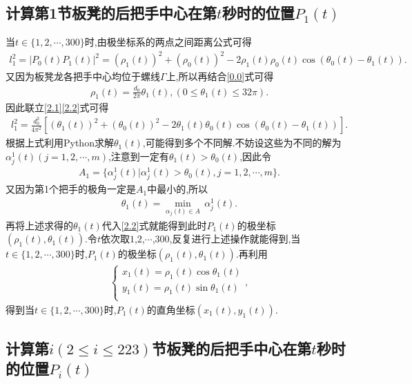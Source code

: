 \documentclass[lang=cn,newtx,10pt,scheme=chinese]{../Template/elegantbook}
\begin{document}
\subsection{计算第1节板凳的后把手中心在第\(t\)秒时的位置\(P_1(t)\)}\label{2.(1)}

当\(t\in \{ 1,2,\cdots ,300 \}\)时,由极坐标系的两点之间距离公式可得
\begin{align}
l_{1}^{2}=| P_0(t)P_1(t)|^2=(\rho _1(t))^2+(\rho _0(t))^2 - 2\rho _1(t)\rho _0(t)\cos (\theta _0(t)-\theta _1(t)) .\label{2.1} 
\end{align}
又因为板凳龙各把手中心均位于螺线\(\varGamma\)上,所以再结合\eqref{0.0}式可得
\begin{align}
\rho _1(t)=\frac{d_0}{2\pi}\theta _1(t),(0\leqslant \theta _1(t)\leqslant 32\pi) .\label{2.2}
\end{align}
因此联立\eqref{2.1}\eqref{2.2}式可得
\begin{align}
l_{1}^{2}=\frac{d_{0}^{2}}{4\pi ^2}[(\theta _1(t))^2+(\theta _0(t))^2 - 2\theta _1(t)\theta _0(t)\cos (\theta _0(t)-\theta _1(t))] .\label{2.0}
\end{align}
根据上式利用Python求解\(\theta _1(t)\),可能得到多个不同解.不妨设这些为不同的解为\(\alpha _{j}^{1}(t) (j = 1,2,\cdots ,m)\),注意到一定有\(\theta _1(t)>\theta _0(t)\),因此令
\begin{align}
A_1 = \{ \alpha _{j}^{1}(t) |\alpha _{j}^{1}(t) >\theta _0(t),j = 1,2,\cdots ,m \} .
\end{align}
又因为第1个把手的极角一定是$A_1$中最小的,所以
\begin{align}
\theta _1(t)=\underset{\alpha _j(t)\in A}{\min}\,\alpha _{j}^{1}(t).
\end{align}
再将上述求得的\(\theta _1(t)\)代入\eqref{2.2}式就能得到此时\(P_1(t)\)的极坐标\((\rho _1(t),\theta _1(t))\).令\(t\)依次取\(1\),\(2\),\(\cdots\),\(300\),反复进行上述操作就能得到,当\(t\in \{ 1,2,\cdots ,300 \}\)时,\(P_1(t)\)的极坐标\((\rho _1(t),\theta _1(t))\).再利用
\begin{align}
\begin{cases}
x_1(t)=\rho _1(t)\cos \theta _1(t)\\
y_1(t)=\rho _1(t)\sin \theta _1(t)\\
\end{cases},    
\end{align}
得到当\(t\in \{ 1,2,\cdots ,300 \}\)时,\(P_1(t)\)的直角坐标\((x_1(t),y_1(t))\).

\subsection{计算第\(i(2\leqslant i\leqslant 223)\)节板凳的后把手中心在第\(t\)秒时的位置\(P_{i}(t)\)}\label{2.(2)}
\end{document}

